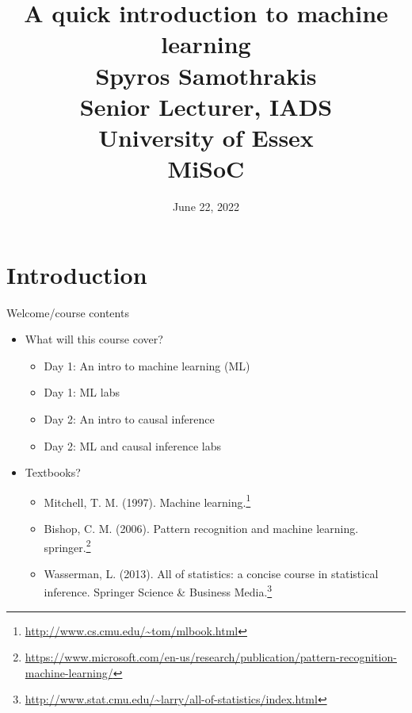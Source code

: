 \documentclass[obeyspaces,aspectratio=43]{beamer}
\title{A quick introduction to machine learning\\
Spyros Samothrakis\\
Senior Lecturer, IADS\\
University of Essex\\
MiSoC}
\author{June 22, 2022}
\date{}
\renewcommand{\href}[2]{#2\footnote{\url{#1}}}
\providecommand{\tightlist}{%
  \setlength{\itemsep}{0pt}\setlength{\parskip}{0pt}}
\begin{document}
\frame{\titlepage}


\section{}\label{section}

\usebackgroundtemplate{

}

\section{Introduction}\label{introduction}

\begin{frame}{Welcome/course contents}

\begin{itemize}
\tightlist
\item
  What will this course cover?

  \begin{itemize}
  \tightlist
  \item
    Day 1: An intro to machine learning (ML)
  \item
    Day 1: ML labs
  \item
    Day 2: An intro to causal inference
  \item
    Day 2: ML and causal inference labs
  \end{itemize}
\item
  Textbooks?

  \begin{itemize}
  \item
    \href{http://www.cs.cmu.edu/~tom/mlbook.html}{Mitchell, T. M.
    (1997). Machine learning.}
  \item
    \href{https://www.microsoft.com/en-us/research/publication/pattern-recognition-machine-learning/}{Bishop,
    C. M. (2006). Pattern recognition and machine learning. springer.}
  \item
    \href{http://www.stat.cmu.edu/~larry/all-of-statistics/index.html}{Wasserman,
    L. (2013). All of statistics: a concise course in statistical
    inference. Springer Science \& Business Media.}
  \end{itemize}
\end{itemize}

\end{frame}
\end{document}
